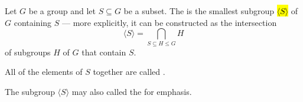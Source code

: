 \begin{definition} \label{definition:subgroup_of_a_group_generated_by_elements}
    Let $G$ be a group and let $S \subseteq G$ be a subset. 
    The  is the smallest subgroup \hl{$\langle S \rangle$} of $G$ containing $S$ --- more explicitly, it can be constructed as the intersection
    $$\langle S \rangle = \bigcap_{S \subseteq H \leq G} H$$
    of subgroups $H$ of $G$ that contain $S$.

    All of the elements of $S$ together are called .

    The subgroup $\langle S \rangle$ may also called the  for emphasis.
\end{definition}
